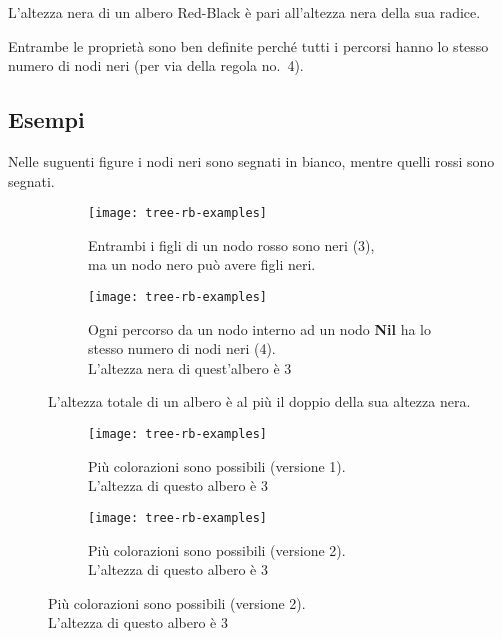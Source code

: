 \begin{property*}
L'altezza nera di un albero Red-Black è pari all'altezza nera della sua radice.
\end{property*}

Entrambe le proprietà sono ben definite perché tutti i percorsi hanno lo stesso numero di nodi neri (per via della regola no.\ 4).

\clearpage
\subsection*{Esempi}

Nelle suguenti figure i nodi neri sono segnati in bianco, mentre quelli rossi sono segnati.

\begin{figure}[H]\centering
	\renewcommand{\subfigurename}{Es.}
	\renewcommand\thesubfigure{\arabic{subfigure}}
	\captionsetup[subfigure]{labelformat=simple, labelsep=space}
	\begin{subfigure}[t]{.48\linewidth}\centering
		\texttt{[image: tree-rb-examples]}
		\caption{Entrambi i figli di un nodo rosso sono neri (3),\\ma un nodo nero può avere figli neri.}
	\end{subfigure}
	\hfill
	\begin{subfigure}[t]{.48\linewidth}\centering
		\texttt{[image: tree-rb-examples]}
		\caption{Ogni percorso da un nodo interno ad un nodo \textbf{Nil} ha lo stesso numero  di nodi neri (4).\\L'altezza nera di quest'albero è 3}
		\vspace{5pt}
	\end{subfigure}

	\begin{lemma}
	L'altezza totale di un albero è al più il doppio della sua altezza nera.
	\end{lemma}

	\begin{subfigure}[t]{.48\linewidth}\centering
		\texttt{[image: tree-rb-examples]}
		\caption{Più colorazioni sono possibili (versione 1).\\L'altezza di questo albero è 3}
	\end{subfigure}
	\hfill
	\begin{subfigure}[t]{.48\linewidth}\centering
		\texttt{[image: tree-rb-examples]}
		\caption{Più colorazioni sono possibili (versione 2).\\L'altezza di questo albero è 3}
	\end{subfigure}


\end{figure}
